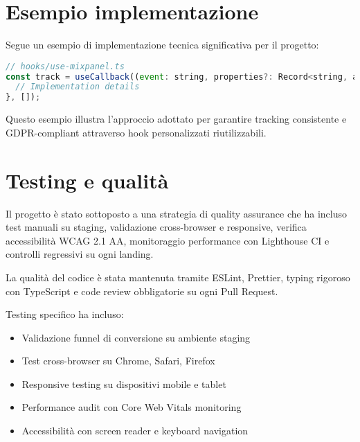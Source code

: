 \section{Esempio implementazione}
Segue un esempio di implementazione tecnica significativa per il progetto:

\begin{lstlisting}[language=JavaScript, caption=Custom hook per tracking]
// hooks/use-mixpanel.ts
const track = useCallback((event: string, properties?: Record<string, any>) => {
  // Implementation details
}, []);
\end{lstlisting}

Questo esempio illustra l'approccio adottato per garantire tracking consistente 
e GDPR-compliant attraverso hook personalizzati riutilizzabili.

\section{Testing e qualità}
Il progetto è stato sottoposto a una strategia di quality assurance che ha
incluso test manuali su staging, validazione cross-browser e responsive,
verifica accessibilità WCAG 2.1 AA, monitoraggio performance con Lighthouse CI e
controlli regressivi su ogni landing.  

La qualità del codice è stata mantenuta tramite ESLint, Prettier, typing
rigoroso con TypeScript e code review obbligatorie su ogni Pull Request.

Testing specifico ha incluso:
\begin{itemize}
  \item Validazione funnel di conversione su ambiente staging
  \item Test cross-browser su Chrome, Safari, Firefox
  \item Responsive testing su dispositivi mobile e tablet
  \item Performance audit con Core Web Vitals monitoring
  \item Accessibilità con screen reader e keyboard navigation
\end{itemize}